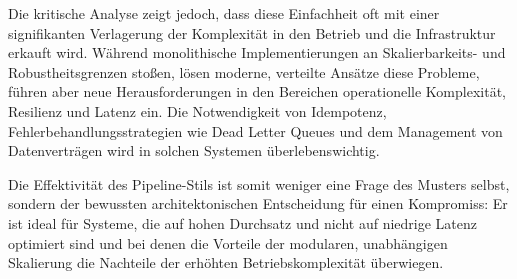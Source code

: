 \documentclass[10pt,a4paper]{article}
\begin{document}
Die kritische Analyse zeigt jedoch, dass diese Einfachheit oft mit einer signifikanten Verlagerung der Komplexität in den Betrieb und die Infrastruktur erkauft wird. Während monolithische Implementierungen an Skalierbarkeits- und Robustheitsgrenzen stoßen, lösen moderne, verteilte Ansätze diese Probleme, führen aber neue Herausforderungen in den Bereichen operationelle Komplexität, Resilienz und Latenz ein. Die Notwendigkeit von Idempotenz, Fehlerbehandlungsstrategien wie Dead Letter Queues und dem Management von Datenverträgen wird in solchen Systemen überlebenswichtig.

Die Effektivität des Pipeline-Stils ist somit weniger eine Frage des Musters selbst, sondern der bewussten architektonischen Entscheidung für einen Kompromiss: Er ist ideal für Systeme, die auf hohen Durchsatz und nicht auf niedrige Latenz optimiert sind und bei denen die Vorteile der modularen, unabhängigen Skalierung die Nachteile der erhöhten Betriebskomplexität überwiegen.
\end{document}
